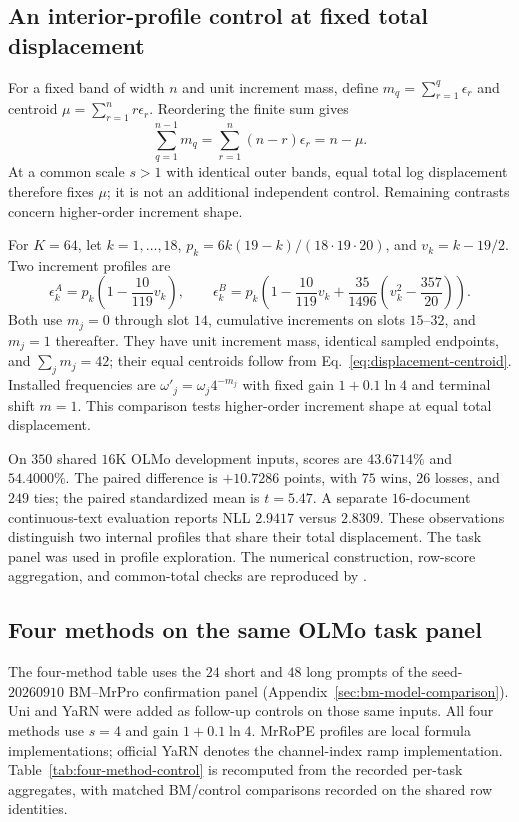 \subsection{An interior-profile control at fixed total displacement}
\label{sec:fixed-total-profile}

For a fixed band of width $n$ and unit increment mass, define $m_q=\sum_{r=1}^q\epsilon_r$ and centroid $\mu=\sum_{r=1}^n r\epsilon_r$. Reordering the finite sum gives
\begin{equation}
\sum_{q=1}^{n-1}m_q=\sum_{r=1}^n(n-r)\epsilon_r=n-\mu.
\label{eq:displacement-centroid}
\end{equation}
At a common scale $s>1$ with identical outer bands, equal total log displacement therefore fixes $\mu$; it is not an additional independent control. Remaining contrasts concern higher-order increment shape.

For $K=64$, let $k=1,\ldots,18$, $p_k=6k(19-k)/(18\cdot19\cdot20)$, and $v_k=k-19/2$. Two increment profiles are
\[
\epsilon_k^{A}=p_k\left(1-\frac{10}{119}v_k\right),\qquad
\epsilon_k^{B}=p_k\left(1-\frac{10}{119}v_k+
\frac{35}{1496}\left(v_k^2-\frac{357}{20}\right)\right).
\]
Both use $m_j=0$ through slot $14$, cumulative increments on slots $15$--$32$, and $m_j=1$ thereafter. They have unit increment mass, identical sampled endpoints, and $\sum_jm_j=42$; their equal centroids follow from Eq.~\eqref{eq:displacement-centroid}. Installed frequencies are $\omega'_j=\omega_j4^{-m_j}$ with fixed gain $1+0.1\ln4$ and terminal shift $m=1$. This comparison tests higher-order increment shape at equal total displacement.

On $350$ shared $16$K OLMo development inputs, scores are $43.6714\%$ and $54.4000\%$. The paired difference is $+10.7286$ points, with $75$ wins, $26$ losses, and $249$ ties; the paired standardized mean is $t=5.47$. A separate $16$-document continuous-text evaluation reports NLL $2.9417$ versus $2.8309$. These observations distinguish two internal profiles that share their total displacement. The task panel was used in profile exploration. The numerical construction, row-score aggregation, and common-total checks are reproduced by .

\subsection{Four methods on the same OLMo task panel}
\label{sec:four-method-control}

The four-method table uses the $24$ short and $48$ long prompts of the seed-$20260910$ BM--MrPro confirmation panel (Appendix~\ref{sec:bm-model-comparison}). Uni and YaRN were added as follow-up controls on those same inputs. All four methods use $s=4$ and gain $1+0.1\ln4$. MrRoPE profiles are local formula implementations; official YaRN denotes the channel-index ramp implementation. Table~\ref{tab:four-method-control} is recomputed from the recorded per-task aggregates, with matched BM/control comparisons recorded on the shared row identities.

